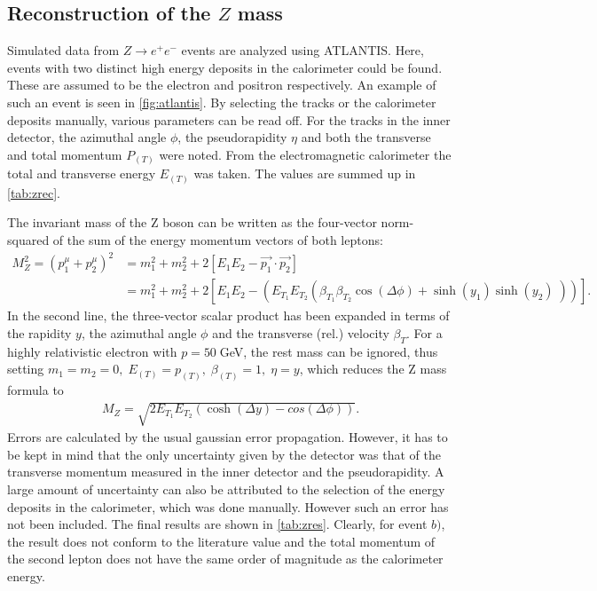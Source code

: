 \documentclass[twoside,        %
               BCOR12mm,       %
               ngerman,english, %
               fleqn,headsepline=false,footsepline=false
              ]{Vorlage/MFPREPORT}
\begin{document}
\subsection{Reconstruction of the $Z$ mass}
Simulated data from $Z\rightarrow e^+e^-$ events are analyzed using ATLANTIS.
Here, events with two distinct  high energy deposits in the calorimeter could
be found. These are assumed to be the electron and positron respectively. An
example of such an event is seen in \cref{fig:atlantis}. By selecting the
tracks or the calorimeter deposits manually, various parameters can be read
off. For the tracks in the inner detector, the azimuthal angle $\phi$, the
pseudorapidity $\eta$ and both the transverse and total momentum $P_{(T)}$ were
noted. From the electromagnetic calorimeter the total and transverse energy
$E_{(T)}$ was taken. The values are summed up in \cref{tab:zrec}.

The invariant mass of the Z boson can be written as the four-vector
norm-squared of the sum of the energy momentum vectors of both leptons:
\begin{align}
    M_Z^2=(p_1^\mu+p_2^\mu)^2&=m_1^2+m_2^2+2[E_1
    E_2-\vec{p_1}\cdot\vec{p_2}]\\&=m_1^2+m_2^2+2[E_1
    E_2-(E_{T_1}E_{T_2}(\beta_{T_1}\beta_{T_2}\cos(\Delta\phi)+\sinh(y_1)\sinh(y_2)\;))].
\end{align}
In the second line, the three-vector scalar product has been expanded in terms
of the rapidity $y$, the azimuthal angle $\phi$ and the transverse (rel.)
velocity $\beta_T$. For a highly relativistic electron with $p=50\;$GeV, the rest mass can be
ignored, thus setting $m_1=m_2=0,\;E_{(T)}=p_{(T)},\;\beta_{(T)}=1,\;\eta=y$,
which reduces the Z mass formula to
\begin{align}
    \label{eq:zmass}
    M_Z=\sqrt{2E_{T_1}E_{T_2}(\cosh(\Delta y)-cos(\Delta\phi))}.
\end{align}
Errors are calculated by the usual gaussian error propagation. However, it has
to be kept in mind that the only uncertainty given by the detector was that of
the transverse momentum measured in the inner detector and the pseudorapidity.
A large amount of uncertainty can also be attributed to the selection of the
energy deposits in the calorimeter, which was done manually. However such an
error has not been included.
The final results are shown in \cref{tab:zres}. Clearly, for event $b)$, the
result does not conform to the literature value and the total momentum of the
second lepton does not have the same order of magnitude as the calorimeter
energy.
\end{document}
